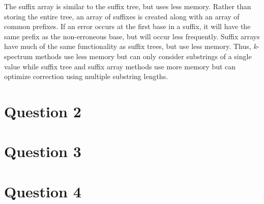 The suffix array is similar to the suffix tree, but uses less memory. Rather than storing the entire tree, an array of suffixes is created along with an array of common prefixes. If an error occurs at the first base in a suffix, it will have the same prefix as the non-erroneous base, but will occur less frequently. Suffix arrays have much of the same functionality as suffix trees, but use less memory.
Thus, \textit{k}-spectrum methods use less memory but can only consider substrings of a single value while suffix tree and suffix array methods use more memory but can optimize correction using multiple substring lengths.

\section{Question 2}

\section{Question 3}


\section{Question 4}




